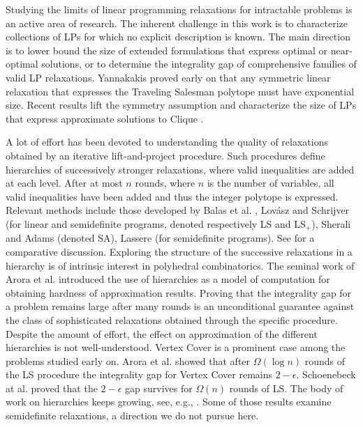 \documentclass[11pt]{article}\usepackage{amsmath}
\begin{document}
Studying the limits of linear programming  relaxations for 
intractable problems is
an active area of research. 
The inherent challenge in this work is  to characterize collections
of LPs 
for which no explicit description is known. 
The
main  direction is to lower bound 
the size of extended formulations
that express optimal or near-optimal solutions,
or to determine
the  integrality gap of  comprehensive families  of
valid LP relaxations. 
  Yannakakis \cite{Yannakakis91}  proved early on that 
any 
symmetric linear relaxation that expresses the Traveling Salesman
polytope must have exponential size. 
 Recent results lift the symmetry assumption 
\cite{FioriniMPTD12}   and  characterize  the size of LPs that
express approximate solutions  to Clique \cite{BraunFPS12,BravermanM13}. 


A lot of effort has been  devoted to 
understanding the quality of relaxations obtained by an iterative 
lift-and-project procedure. Such procedures define hierarchies of 
successively  stronger relaxations, where  valid inequalities are added at 
each level. After at most $n$ rounds, where $n$ is the number of 
variables, all 
valid inequalities have been  added and thus the integer polytope is
expressed. 
Relevant methods  include those  developed  by Balas et
al. \cite{BalasCC93},  Lov\'{a}sz and Schrijver \cite{LovaszS91} (for
linear and semidefinite programs, denoted respectively LS and LS$_{+}$), 
Sherali and Adams \cite{SheraliA90} (denoted SA),    Lassere  \cite{Lasserre01}
(for semidefinite programs). 
See
\cite{laurent} for a comparative discussion.  
Exploring the
structure of the successive relaxations  in a hierarchy 
is of intrinsic interest in polyhedral
combinatorics. The seminal work of Arora et al.
\cite{AroraBL02,AroraBLT06} introduced the use of 
hierarchies as a model of computation for obtaining  hardness of
approximation results. 
Proving that the integrality 
gap for a problem remains large  after many 
rounds   is an unconditional  guarantee against the  class of
sophisticated relaxations
obtained through the specific procedure. 
Despite the amount of effort, the effect on approximation  of the
 different hierarchies is not well-understood. Vertex Cover is a
  prominent case among the problems studied early on. 
Arora et al. \cite{AroraBLT06} showed that after
$\Omega(\log n)$ rounds of the LS procedure the
integrality gap for Vertex Cover remains $2-\epsilon.$ Schoenebeck at
al. \cite{SchoenebeckTT07} proved that the $2-\epsilon$ gap survives
for $\Omega(n)$ rounds of  LS. The body of 
work on   hierarchies keeps growing, see, e.g., 
\cite{GeorgiouMPT10,FernandezdlVKM07,SchoenebeckTT07b,CharikarMM09,MathieuS09,Tulsiani09,BhaskaraCVGZ12}. Some
of
those results examine  semidefinite relaxations, a direction we do not
 pursue here. 
\end{document}
